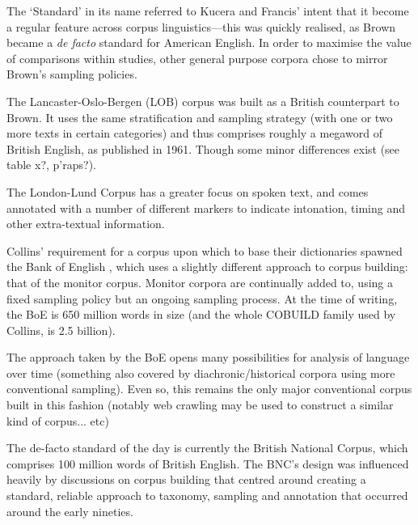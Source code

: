 The `Standard' in its name referred to Kucera and Francis' intent that it become a regular feature across corpus linguistics---this was quickly realised, as Brown became a \textsl{de facto} standard for American English.  In order to maximise the value of comparisons within studies, other general purpose corpora chose to mirror Brown's sampling policies.  


The Lancaster-Oslo-Bergen (LOB) corpus was built as a British counterpart to Brown.  %
It uses the same stratification and sampling strategy (with one or two more texts in certain categories) and thus comprises roughly a megaword of British English, as published in 1961.  %
Though some minor differences exist (see table x?, p'raps?).


The London-Lund Corpus %
has a greater focus on spoken text, and comes annotated with a number of different markers to indicate intonation, timing and other extra-textual information.  


Collins' requirement for a corpus upon which to base their dictionaries spawned the Bank of English
, which uses a slightly different approach to corpus building: that of the monitor corpus.  Monitor corpora are continually added to, using a fixed sampling policy but an ongoing sampling process.  At the time of writing, the BoE is 650 million words in size (and the whole COBUILD family used by Collins, is 2.5 billion).

The approach taken by the BoE opens many possibilities for analysis of language over time (something also covered by diachronic/historical corpora using more conventional sampling).  Even so, this remains the only major conventional corpus built in this fashion (notably web crawling may be used to construct a similar kind of corpus... etc)

The de-facto standard of the day is currently the British National Corpus, which comprises 100 million words of British English.  The BNC's design was influenced heavily by discussions on corpus building that centred around creating a standard, reliable approach to taxonomy, sampling and annotation that occurred around the early nineties.


